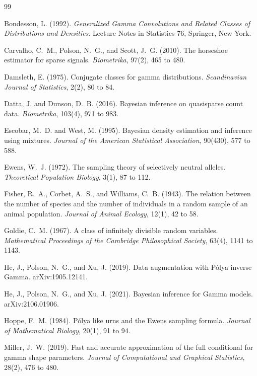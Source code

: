 \begin{thebibliography}{99}

Bondesson, L. (1992). \emph{Generalized Gamma Convolutions and Related Classes of Distributions and Densities}. Lecture Notes in Statistics 76, Springer, New York.

Carvalho, C.~M., Polson, N.~G., and Scott, J.~G. (2010). The horseshoe estimator for sparse signals. \emph{Biometrika}, 97(2), 465 to 480.

Damsleth, E. (1975). Conjugate classes for gamma distributions. \emph{Scandinavian Journal of Statistics}, 2(2), 80 to 84.

Datta, J. and Dunson, D.~B. (2016). Bayesian inference on quasisparse count data. \emph{Biometrika}, 103(4), 971 to 983.

Escobar, M.~D. and West, M. (1995). Bayesian density estimation and inference using mixtures. \emph{Journal of the American Statistical Association}, 90(430), 577 to 588.

Ewens, W.~J. (1972). The sampling theory of selectively neutral alleles. \emph{Theoretical Population Biology}, 3(1), 87 to 112.

Fisher, R.~A., Corbet, A.~S., and Williams, C.~B. (1943). The relation between the number of species and the number of individuals in a random sample of an animal population. \emph{Journal of Animal Ecology}, 12(1), 42 to 58.

Goldie, C.~M. (1967). A class of infinitely divisible random variables. \emph{Mathematical Proceedings of the Cambridge Philosophical Society}, 63(4), 1141 to 1143.

He, J., Polson, N.~G., and Xu, J. (2019). Data augmentation with P\'olya inverse Gamma. arXiv:1905.12141.

He, J., Polson, N.~G., and Xu, J. (2021). Bayesian inference for Gamma models. arXiv:2106.01906.

Hoppe, F.~M. (1984). P\'olya like urns and the Ewens sampling formula. \emph{Journal of Mathematical Biology}, 20(1), 91 to 94.

Miller, J.~W. (2019). Fast and accurate approximation of the full conditional for gamma shape parameters. \emph{Journal of Computational and Graphical Statistics}, 28(2), 476 to 480.


\end{thebibliography}
